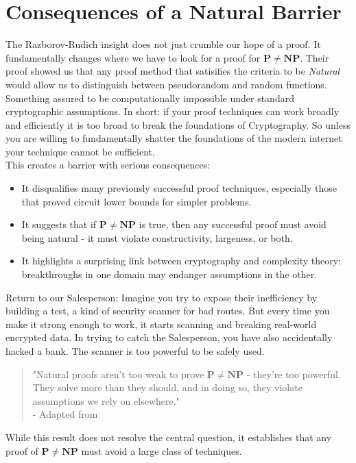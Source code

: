 \documentclass[12pt]{report}
\begin{document}
\section{Consequences of a Natural Barrier}
The Razborov-Rudich insight does not just crumble our hope of a proof.
It fundamentally changes where we have to look for a proof for $\mathbf{P \ne NP}$.
Their proof showed us that any proof method that satisifies the criteria to be \textit{Natural} would allow us to distinguish between pseudorandom and random functions.
Something assured to be computationally impossible under standard cryptographic assumptions.
In short: if your proof techniques can work broadly and efficiently it is too broad to break the foundations of Cryptography.
So unless you are willing to fundamentally shatter the foundations of the modern internet your technique cannot be sufficient.\\
This creates a barrier with serious consequences:
\begin{itemize}
    \item It disqualifies many previously successful proof techniques, especially those that proved circuit lower bounds for simpler problems.
    \item It suggests that if $\mathbf{P \ne NP}$ is true, then any successful proof must avoid being natural - it must violate constructivity, largeness, or both.
    \item It highlights a surprising link between cryptography and complexity theory: breakthroughs in one domain may endanger assumptions in the other.
\end{itemize}
Return to our Salesperson:
Imagine you try to expose their inefficiency by building a test, a kind of security scanner for bad routes.
But every time you make it strong enough to work, it starts scanning and breaking real-world encrypted data.
In trying to catch the Salesperson, you have also accidentally hacked a bank.
The scanner is too powerful to be safely used.

\begin{quote}
    "Natural proofs aren't too weak to prove $\mathbf{P \ne NP}$ - they're too powerful.
    They solve more than they should, and in doing so, they violate assumptions we rely on elsewhere."\\
    - Adapted from \cite{razborov1994}
\end{quote}

While this result does not resolve the central question, it establishes that any proof of $\mathbf{P \ne NP}$ must avoid a large class of techniques.
\vspace{3cm}
\end{document}
